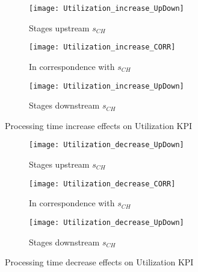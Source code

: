 \begin{landscape}
\begin{figure}[p]
  \centering
  \begin{subfigure}[t]{0.4\textwidth}
    \texttt{[image: Utilization\_increase\_UpDown]}
    \caption{Stages upstream $s_{CH}$}
    \label{fig:Processing time increase effects on Utilization KPI - Stages upstream}   
  \end{subfigure}
  \begin{subfigure}[t]{0.4\textwidth}
    \texttt{[image: Utilization\_increase\_CORR]}
    \caption{In correspondence with $s_{CH}$}
    \label{fig:Processing time increase effects on Utilization KPI - In correspondence with}   
  \end{subfigure}
  \begin{subfigure}[t]{0.4\textwidth}
    \texttt{[image: Utilization\_increase\_UpDown]}
    \caption{Stages downstream $s_{CH}$}
    \label{fig:Processing time increase effects on Utilization KPI - Stages downstream}   
  \end{subfigure}
  \caption{Processing time increase effects on Utilization KPI}
  \label{fig:Processing time increase effects on Utilization KPI}
\end{figure}
\begin{figure}[p]
  \centering
  \begin{subfigure}[b]{0.4\textwidth}
    \texttt{[image: Utilization\_decrease\_UpDown]}
    \caption{Stages upstream $s_{CH}$}
    \label{fig:Processing time decrease effects on Utilization KPI - Stages upstream}   
  \end{subfigure}
  \begin{subfigure}[b]{0.4\textwidth}
    \texttt{[image: Utilization\_decrease\_CORR]}
    \caption{In correspondence with $s_{CH}$}
    \label{fig:Processing time decrease effects on Utilization KPI - In correspondence with}   
  \end{subfigure}
  \begin{subfigure}[b]{0.4\textwidth}
    \texttt{[image: Utilization\_decrease\_UpDown]}
    \caption{Stages downstream $s_{CH}$}
    \label{fig:Processing time decrease effects on Utilization KPI - Stages downstream}   
  \end{subfigure}
  \caption{Processing time decrease effects on Utilization KPI}
  \label{fig:Processing time decrease effects on Utilization KPI}
\end{figure}
\end{landscape}
